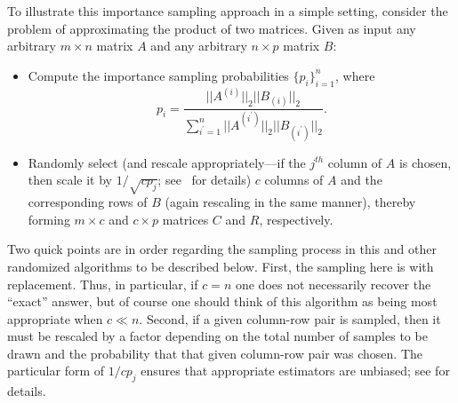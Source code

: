 \documentclass[twoside]{article}
\begin{document}
To illustrate this importance sampling approach in a simple setting, 
consider the problem of approximating the product of two matrices.
Given as input any arbitrary $m \times n$ matrix $A$ and any arbitrary 
$n \times p$ matrix $B$:
\begin{itemize}
\item
Compute the importance sampling probabilities $\{p_i\}_{i=1}^{n}$, where 
\begin{equation}
p_i = \frac{||A^{(i)}||_2||B_{(i)}||_2 }{\sum_{i^\prime=1}^{n} ||A^{(i^\prime)}||_2||B_{(i^\prime)}||_2 }   .
\label{eqn:optimal_probs}
\end{equation}
\item
Randomly select (and rescale appropriately---if the $j^{th}$ column of $A$
is chosen, then scale it by $1/\sqrt{cp_{j}}$; see~\cite{dkm_matrix1} for 
details) 
$c$ 
columns of $A$ and the corresponding rows of $B$ (again rescaling in the 
same manner), thereby forming $m \times c$ and $c \times p$ matrices $C$ 
and $R$, respectively.
\end{itemize}
Two quick points are in order regarding the sampling process in this and 
other randomized algorithms to be described below.
First, the sampling here is with replacement.
Thus, in particular, if $c=n$ one does not necessarily recover the ``exact'' 
answer, but of course one should think of this algorithm as being most 
appropriate when $c \ll n$.
Second, if a given column-row pair is sampled, then it must be rescaled by a 
factor depending on the total number of samples to be drawn and the 
probability that that given column-row pair was chosen.
The particular form of $1/cp_{j}$ ensures that appropriate estimators are 
unbiased; see \cite{dkm_matrix1} for details.
\end{document}
